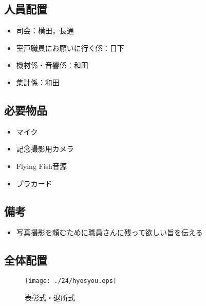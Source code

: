 \subsection{人員配置}
\begin{itemize}
\item 司会：横田，長通
\item 室戸職員にお願いに行く係：日下
\item 機材係・音響係：和田
\item 集計係：和田
\end{itemize}


\subsection{必要物品}
\begin{itemize}
\item マイク
\item 記念撮影用カメラ
\item Flying Fish音源
\item プラカード
\end{itemize}
\subsection{備考}
\begin{itemize}
\item 写真撮影を頼むために職員さんに残って欲しい旨を伝える
\end{itemize}

\subsection{全体配置}
\begin{figure}[htbp]
  \begin{center}
  \texttt{[image: ./24/hyosyou.eps]}
  \caption{表彰式・退所式}
  \end{center}
\end{figure}

%
